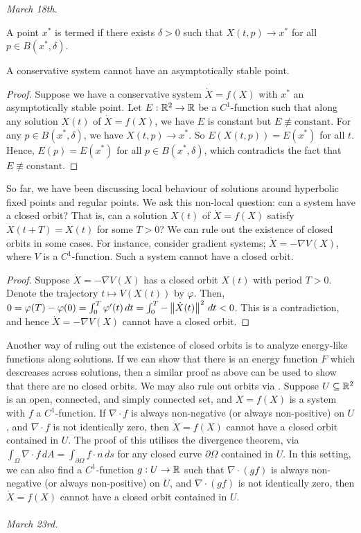 \textit{March 18th.}

A point $x^{\ast}$ is termed  if there exists $\delta > 0$ such that $X(t,p) \to x^{\ast}$ for all $p \in B(x^{\ast},\delta)$.

\begin{lemma}
    A conservative system cannot have an asymptotically stable point.
\end{lemma}
\begin{proof}
    Suppose we have a conservative system $\dot{X} = f(X)$ with $x^{\ast}$ an asymptotically stable point. Let $E:\mathbb{R}^{2} \to \mathbb{R}$ be a $C^{1}$-function such that along any solution $X(t)$ of $\dot{X} = f(X)$, we have $E$ is constant but $E \not\equiv \text{constant}$. For any $p \in B(x^{\ast},\delta)$, we have $X(t,p) \to x^{\ast}$. So $E(X(t,p)) = E(x^{\ast})$ for all $t$. Hence, $E(p) = E(x^{\ast})$ for all $p \in B(x^{\ast},\delta)$, which contradicts the fact that $E \not\equiv \text{constant}$.
\end{proof}

So far, we have been discussing local behaviour of solutions around hyperbolic fixed points and regular points. We ask this non-local question: can a system have a closed orbit? That is, can a solution $X(t)$ of $\dot{X} = f(X)$ satisfy $X(t+T) = X(t)$ for some $T > 0$? We can rule out the existence of closed orbits in some cases. For instance, consider gradient systems; $\dot{X} = - \nabla V(X)$, where $V$ is a $C^{1}$-function. Such a system cannot have a closed orbit.

\begin{proof}
    Suppose $\dot{X} = - \nabla V(X)$ has a closed orbit $X(t)$ with period $T > 0$. Denote the trajectory $t \mapsto V(X(t))$ by $\varphi$. Then, $0 = \varphi(T) - \varphi(0) = \int_{0}^{T} \varphi'(t) \, dt = \int_{0}^{T} -\left\lVert\dot{X}(t)\right\rVert^{2} \, dt < 0$. This is a contradiction, and hence $\dot{X} = - \nabla V(X)$ cannot have a closed orbit.
\end{proof}

Another way of ruling out the existence of closed orbits is to analyze energy-like functions along solutions. If we can show that there is an energy function $F$ which descreases across solutions, then a similar proof as above can be used to show that there are no closed orbits. We may also rule out orbits via . Suppose $U \subseteq \mathbb{R}^{2}$ is an open, connected, and simply connected set, and $\dot{X} = f(X)$ is a system with $f$ a $C^{1}$-function. If $\nabla \cdot f$ is always non-negative (or always non-positive) on $U$, and $\nabla \cdot f$ is not identically zero, then $\dot{X} = f(X)$ cannot have a closed orbit contained in $U$. The proof of this utilises the divergence theorem, via $\int_{\Omega} \nabla \cdot f \, dA = \int_{\partial \Omega} f \cdot n \, ds$ for any closed curve $\partial \Omega$ contained in $U$. In this setting, we can also find a $C^{1}$-function $g:U \to \mathbb{R}$ such that $\nabla \cdot (g f)$ is always non-negative (or always non-positive) on $U$, and $\nabla \cdot (g f)$ is not identically zero, then $\dot{X} = f(X)$ cannot have a closed orbit contained in $U$.
\\ \\
\textit{March 23rd.}


